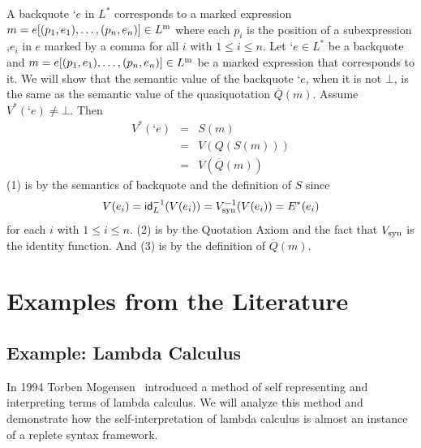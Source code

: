 \documentclass[11pt,fleqn]{article}
\newcommand{\bsp}{\begin{sloppypar}}
\newcommand{\esp}{\end{sloppypar}}
\newcommand{\mlist}[1]{{[ #1 ]}}
\newcommand{\mname}[1]{\mbox{\sf #1}}
\begin{document}
\bsp A backquote $\texttt{`}e$ in $L^\ast$ corresponds to a marked
expression $m = e\mlist{(p_1,e_1),\ldots,(p_n,e_n)} \in L^{\rm m}$
where each $p_i$ is the position of a subexpression $\texttt{,}e_i$ in
$e$ marked by a comma for all $i$ with $1 \le i \le n$.  Let
$\texttt{`}e \in L^\ast$ be a backquote and $m =
e\mlist{(p_1,e_1),\ldots,(p_n,e_n)} \in L^{\rm m}$ be a marked
expression that corresponds to it.  We will show that the semantic
value of the backquote $\texttt{`}e$, when it is not $\bot$, is the
same as the semantic value of the quasiquotation $\overline{Q}(m)$.
Assume $V^\ast(\texttt{`}e) \not= \bot$.  Then
\setcounter{equation}{0}
\begin{eqnarray}
V^\ast(\texttt{`}e) 
  & = & S(m) \\
  & = & V(Q(S(m))) \\
  & = & V(\overline{Q}(m))
\end{eqnarray}
(1) is by the semantics of backquote and the definition of $S$ since
\[V(e_i) = \mname{id}_{L}^{-1}(V(e_i)) = V_{\rm syn}^{-1}(V(e_i)) =
E^{\ast}(e_i)\] for each $i$ with $1 \le i \le n$.  (2) is by the
Quotation Axiom and the fact that $V_{\rm syn}$ is the identity
function.  And (3) is by the definition of $\overline{Q}(m)$. \esp

\section{Examples from the Literature} \label{sec:literature}

\subsection{Example: Lambda Calculus} \label{subsec:lambda}
\newcommand{\betaarrow}{\twoheadrightarrow_{\beta}}
\newcommand{\nflambda}{{\rm NF}_{\Lambda}}
\newcommand{\nfdomain}{\nflambda \cup \{\bot\}}

In 1994 Torben Mogensen~\cite{Mogensen94} introduced a method of self
representing and interpreting terms of lambda calculus. We will
analyze this method and demonstrate how the self-interpretation of
lambda calculus is almost an instance of a replete syntax framework.
\end{document}
